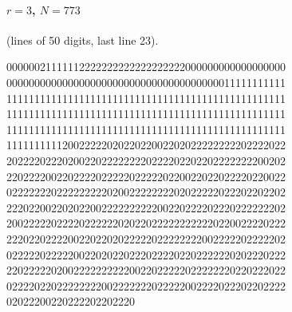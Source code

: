 \documentclass[11pt]{article}
\begin{document}
\paragraph{$r=3$, $N=773$} (lines of 50 digits, last line 23).
\begin{center}\ttfamily\small
00000021111112222222222222222222000000000000000000\\
00000000000000000000000000000000000000011111111111\\
11111111111111111111111111111111111111111111111111\\
11111111111111111111111111111111111111111111111111\\
11111111111111111111111111111111111111111111111111\\
11111111112002222202022022002202022222222202222022\\
20222202220200220222222220222202202202222222200202\\
22022220022022220222220222220220022022022220220022\\
02222222022222222202002222222202022222022202202202\\
22202200220202200222222222200220222202220222222202\\
20022222022220222222020220222222222220220022220222\\
22202202222002202202022222022222222002222202222202\\
02222202222200220202202220222202202222220202220222\\
22022222020022222222220022022222022222220220222022\\
02222022022222222002222222022222002222022202202222\\
02022200220222202202220
\end{center}
\end{document}

